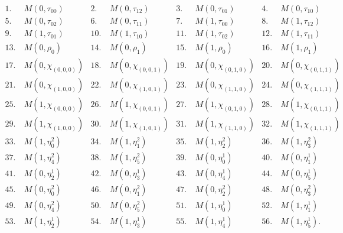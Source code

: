 \begin{align*}
	1. \ & M(0,\tau_{00}) &
	2. \ & M(0,\tau_{12}) &
	3. \ & M(0,\tau_{01}) &
	4. \ & M(0,\tau_{10}) \\
	5. \ & M(0,\tau_{02}) &
	6. \ & M(0,\tau_{11}) &
	7. \ & M(1,\tau_{00}) &
	8. \ & M(1,\tau_{12}) \\
	9. \ & M(1,\tau_{01}) &
	10. \ & M(1,\tau_{10}) &
	11. \ & M(1,\tau_{02}) &
	12. \ & M(1,\tau_{11}) \\
	13. \ & M(0,\rho_{0}) &
	14. \ & M(0,\rho_{1}) &
	15. \ & M(1,\rho_{0}) &
	16. \ & M(1,\rho_{1}) \\
	17. \ & M(0,\chi_{(0,0,0)}) &
	18. \ & M(0,\chi_{(0,0,1)}) &
	19. \ & M(0,\chi_{(0,1,0)}) &
	20. \ & M(0,\chi_{(0,1,1)}) \\
	21. \ & M(0,\chi_{(1,0,0)}) &
	22. \ & M(0,\chi_{(1,0,1)}) &
	23. \ & M(0,\chi_{(1,1,0)}) &
	24. \ & M(0,\chi_{(1,1,1)}) \\
	25. \ & M(1,\chi_{(0,0,0)}) &
	26. \ & M(1,\chi_{(0,0,1)}) &
	27. \ & M(1,\chi_{(0,1,0)}) &
	28. \ & M(1,\chi_{(0,1,1)}) \\
	29. \ & M(1,\chi_{(1,0,0)}) &
	30. \ & M(1,\chi_{(1,0,1)}) &
	31. \ & M(1,\chi_{(1,1,0)}) &
	32. \ & M(1,\chi_{(1,1,1)}) \\
	33. \ & M(1,\eta^{2}_{0}) &
	34. \ & M(1,\eta^{2}_{1}) &
	35. \ & M(1,\eta^{2}_{2}) &
	36. \ & M(1,\eta^{2}_{3}) \\
	37. \ & M(1,\eta^{2}_{4}) &
	38. \ & M(1,\eta^{2}_{5}) &
	39. \ & M(0,\eta^{1}_{0}) &
	40. \ & M(0,\eta^{1}_{1}) \\
	41. \ & M(0,\eta^{1}_{2}) &
	42. \ & M(0,\eta^{1}_{3}) &
	43. \ & M(0,\eta^{1}_{4}) &
	44. \ & M(0,\eta^{1}_{5}) \\
	45. \ & M(0,\eta^{2}_{0}) &
	46. \ & M(0,\eta^{2}_{1}) &
	47. \ & M(0,\eta^{2}_{2}) &
	48. \ & M(0,\eta^{2}_{3}) \\
	49. \ & M(0,\eta^{2}_{4}) &
	50. \ & M(0,\eta^{2}_{5}) &
	51. \ & M(1,\eta^{1}_{0}) &
	52. \ & M(1,\eta^{1}_{1}) \\
	53. \ & M(1,\eta^{1}_{2}) &
	54. \ & M(1,\eta^{1}_{3}) &
	55. \ & M(1,\eta^{1}_{4}) &
	56. \ & M(1,\eta^{1}_{5}).
\end{align*}
